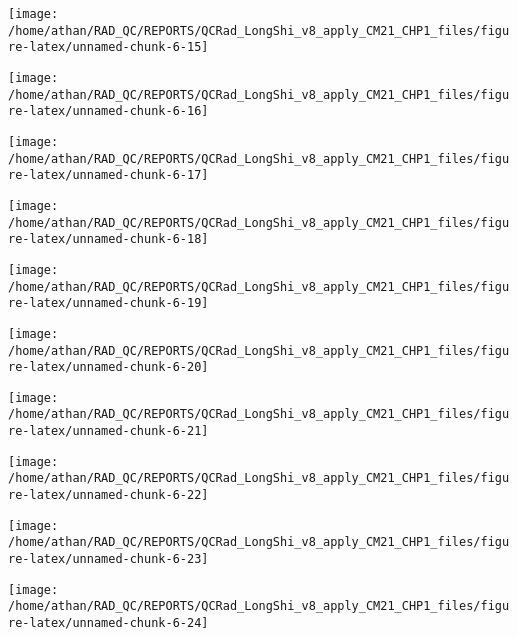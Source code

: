 \documentclass[
  10pt,
  a4paper,oneside]{article}
\begin{document}
\begin{center}\texttt{[image: /home/athan/RAD\_QC/REPORTS/QCRad\_LongShi\_v8\_apply\_CM21\_CHP1\_files/figure-latex/unnamed-chunk-6-15]} \end{center}

\begin{center}\texttt{[image: /home/athan/RAD\_QC/REPORTS/QCRad\_LongShi\_v8\_apply\_CM21\_CHP1\_files/figure-latex/unnamed-chunk-6-16]} \end{center}

\begin{center}\texttt{[image: /home/athan/RAD\_QC/REPORTS/QCRad\_LongShi\_v8\_apply\_CM21\_CHP1\_files/figure-latex/unnamed-chunk-6-17]} \end{center}

\begin{center}\texttt{[image: /home/athan/RAD\_QC/REPORTS/QCRad\_LongShi\_v8\_apply\_CM21\_CHP1\_files/figure-latex/unnamed-chunk-6-18]} \end{center}

\begin{center}\texttt{[image: /home/athan/RAD\_QC/REPORTS/QCRad\_LongShi\_v8\_apply\_CM21\_CHP1\_files/figure-latex/unnamed-chunk-6-19]} \end{center}

\begin{center}\texttt{[image: /home/athan/RAD\_QC/REPORTS/QCRad\_LongShi\_v8\_apply\_CM21\_CHP1\_files/figure-latex/unnamed-chunk-6-20]} \end{center}

\begin{center}\texttt{[image: /home/athan/RAD\_QC/REPORTS/QCRad\_LongShi\_v8\_apply\_CM21\_CHP1\_files/figure-latex/unnamed-chunk-6-21]} \end{center}

\begin{center}\texttt{[image: /home/athan/RAD\_QC/REPORTS/QCRad\_LongShi\_v8\_apply\_CM21\_CHP1\_files/figure-latex/unnamed-chunk-6-22]} \end{center}

\begin{center}\texttt{[image: /home/athan/RAD\_QC/REPORTS/QCRad\_LongShi\_v8\_apply\_CM21\_CHP1\_files/figure-latex/unnamed-chunk-6-23]} \end{center}

\begin{center}\texttt{[image: /home/athan/RAD\_QC/REPORTS/QCRad\_LongShi\_v8\_apply\_CM21\_CHP1\_files/figure-latex/unnamed-chunk-6-24]} \end{center}
\end{document}
